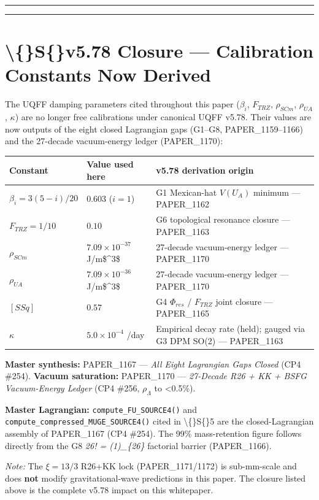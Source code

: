 \documentclass[11pt]{article}
\begin{document}
\noindent\rule{\textwidth}{0.4pt}

\noindent\rule{\textwidth}{0.4pt}

\section*{\textbackslash\{\}S\{\}v5.78 Closure --- Calibration Constants Now Derived}

The UQFF damping parameters cited throughout this paper ($\beta_i$, $F_{TRZ}$, $\rho_{SCm}$, $\rho_{UA}$, $\kappa$) are no longer free calibrations under canonical UQFF v5.78. Their values are now outputs of the eight closed Lagrangian gaps (G1--G8, PAPER\_1159--1166) and the 27-decade vacuum-energy ledger (PAPER\_1170):

\begin{center}
\begin{longtable}{lll}
\toprule
Constant & Value used here & v5.78 derivation origin \tabularnewline
\midrule
\endhead
$\beta_i = 3(5-i)/20$ & $0.603$ ($i=1$) & G1 Mexican-hat $V(U_A)$ minimum --- PAPER\_1162 \tabularnewline
$F_{TRZ} = 1/10$ & $0.10$ & G6 topological resonance closure --- PAPER\_1163 \tabularnewline
$\rho_{SCm}$ & $7.09\times10^{-37}$ J/m\$\textasciicircum{}3\$ & 27-decade vacuum-energy ledger --- PAPER\_1170 \tabularnewline
$\rho_{UA}$ & $7.09\times10^{-36}$ J/m\$\textasciicircum{}3\$ & 27-decade vacuum-energy ledger --- PAPER\_1170 \tabularnewline
$[SSq]$ & $0.57$ & G4 $\Phi_{res}$ / $F_{TRZ}$ joint closure --- PAPER\_1165 \tabularnewline
$\kappa$ & $5.0\times10^{-4}$ /day & Empirical decay rate (held); gauged via G3 DPM SO(2) --- PAPER\_1163 \tabularnewline
\bottomrule
\end{longtable}
\end{center}

\textbf{Master synthesis:} PAPER\_1167 --- \emph{All Eight Lagrangian Gaps Closed} (CP4 \#254). \textbf{Vacuum saturation:} PAPER\_1170 --- \emph{27-Decade R26 + KK + BSFG Vacuum-Energy Ledger} (CP4 \#256, $\rho_\Lambda$ to <0.5\%).

\textbf{Master Lagrangian:} \verb|compute_FU_SOURCE4()| and \verb|compute_compressed_MUGE_SOURCE4()| cited in \textbackslash\{\}S\{\}5 are the closed-Lagrangian assembly of PAPER\_1167 (CP4 \#254). The 99\% mass-retention figure follows directly from the G8 \emph{26! = (1)\_\{26\}} factorial barrier (PAPER\_1166).

\emph{Note:} The $\xi=13/3$ R26+KK lock (PAPER\_1171/1172) is sub-mm-scale and does \textbf{not} modify gravitational-wave predictions in this paper. The closure listed above is the complete v5.78 impact on this whitepaper.
\end{document}
